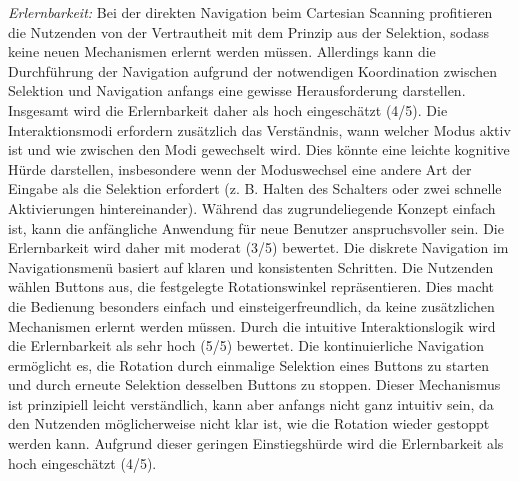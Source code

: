 \textit{Erlernbarkeit:} 
Bei der direkten Navigation beim Cartesian Scanning profitieren die Nutzenden von der Vertrautheit mit dem Prinzip aus der Selektion, sodass keine neuen Mechanismen erlernt werden müssen. Allerdings kann die Durchführung der Navigation aufgrund der notwendigen Koordination zwischen Selektion und Navigation anfangs eine gewisse Herausforderung darstellen. Insgesamt wird die Erlernbarkeit daher als hoch eingeschätzt (4/5). Die Interaktionsmodi erfordern zusätzlich das Verständnis, wann welcher Modus aktiv ist und wie zwischen den Modi gewechselt wird. Dies könnte eine leichte kognitive Hürde darstellen, insbesondere wenn der Moduswechsel eine andere Art der Eingabe als die Selektion erfordert (z. B. Halten des Schalters oder zwei schnelle Aktivierungen hintereinander). Während das zugrundeliegende Konzept einfach ist, kann die anfängliche Anwendung für neue Benutzer anspruchsvoller sein. Die Erlernbarkeit wird daher mit moderat (3/5) bewertet.
Die diskrete Navigation im Navigationsmenü basiert auf klaren und konsistenten Schritten. Die Nutzenden wählen Buttons aus, die festgelegte Rotationswinkel repräsentieren. Dies macht die Bedienung besonders einfach und einsteigerfreundlich, da keine zusätzlichen Mechanismen erlernt werden müssen. Durch die intuitive Interaktionslogik wird die Erlernbarkeit als sehr hoch (5/5) bewertet.
Die kontinuierliche Navigation ermöglicht es, die Rotation durch einmalige Selektion eines Buttons zu starten und durch erneute Selektion desselben Buttons zu stoppen. Dieser Mechanismus ist prinzipiell leicht verständlich, kann aber anfangs nicht ganz intuitiv sein, da den Nutzenden möglicherweise nicht klar ist, wie die Rotation wieder gestoppt werden kann. Aufgrund dieser geringen Einstiegshürde wird die Erlernbarkeit als hoch eingeschätzt (4/5).

